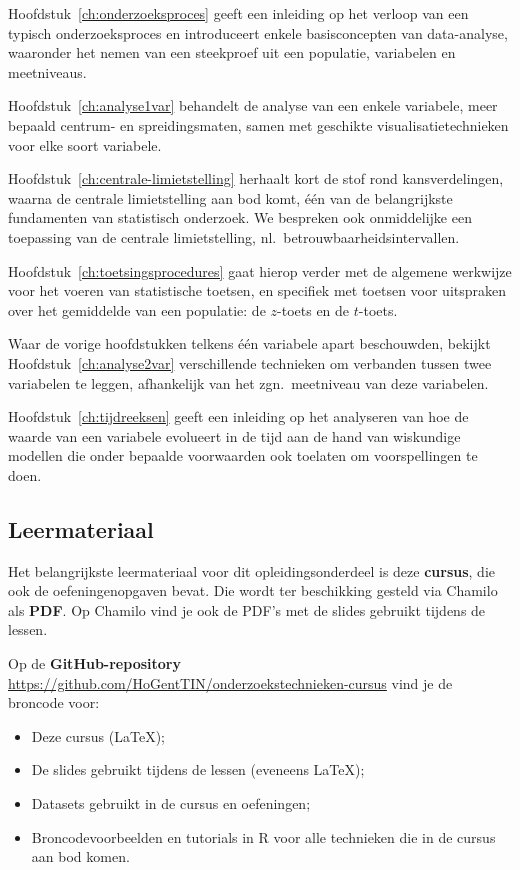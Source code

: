 Hoofdstuk~\ref{ch:onderzoeksproces} geeft een inleiding op het verloop van een typisch onderzoeksproces en introduceert enkele basisconcepten van data-analyse, waaronder het nemen van een steekproef uit een populatie, variabelen en meetniveaus.

Hoofdstuk~\ref{ch:analyse1var} behandelt de analyse van een enkele variabele, meer bepaald centrum- en spreidingsmaten, samen met geschikte visualisatietechnieken voor elke soort variabele.

Hoofdstuk~\ref{ch:centrale-limietstelling} herhaalt kort de stof rond kansverdelingen, waarna de centrale limietstelling aan bod komt, één van de belangrijkste fundamenten van statistisch onderzoek. We bespreken ook  onmiddelijke een toepassing van de centrale limietstelling, nl.\ betrouwbaarheidsintervallen. 

Hoofdstuk~\ref{ch:toetsingsprocedures} gaat hierop verder met de algemene werkwijze voor het voeren van statistische toetsen, en specifiek met toetsen voor uitspraken over het gemiddelde van een populatie: de $z$-toets en de $t$-toets.

Waar de vorige hoofdstukken telkens één variabele apart beschouwden, bekijkt Hoofdstuk~\ref{ch:analyse2var} verschillende technieken om verbanden tussen twee variabelen te leggen, afhankelijk van het zgn.\ meetniveau van deze variabelen.

Hoofdstuk~\ref{ch:tijdreeksen} geeft een inleiding op het analyseren van hoe de waarde van een variabele evolueert in de tijd aan de hand van wiskundige modellen die onder bepaalde voorwaarden ook toelaten om voorspellingen te doen.

\subsection{Leermateriaal}

Het belangrijkste leermateriaal voor dit opleidingsonderdeel is deze \textbf{cursus}, die ook de oefeningenopgaven bevat. Die wordt ter beschikking gesteld via Chamilo als \textbf{PDF}. Op Chamilo vind je ook de PDF's met de slides gebruikt tijdens de lessen.

Op de \textbf{GitHub-repository} \url{https://github.com/HoGentTIN/onderzoekstechnieken-cursus} vind je de broncode voor:

\begin{itemize}
  \item Deze cursus (\LaTeX);
  \item De slides gebruikt tijdens de lessen (eveneens \LaTeX);
  \item Datasets gebruikt in de cursus en oefeningen;
  \item Broncodevoorbeelden en tutorials in R voor alle technieken die in de cursus aan bod komen.
\end{itemize}

